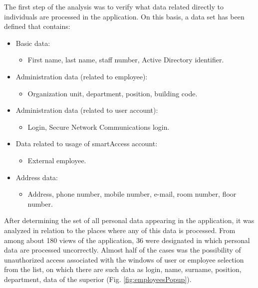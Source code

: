 \documentclass[en, noamssymb]{mgr}
\begin{document}
The first step of the analysis was to verify what data related directly to individuals are processed in the application. On this basis, a data set has been defined that contains:

\begin{itemize}

\item Basic data:

\begin{itemize}
\item First name, last name, staff number, Active Directory identifier.
\end{itemize}

\item Administration data (related to employee):

\begin{itemize}
\item Organization unit, department, position, building code.
\end{itemize}

\item Administration data (related to user account):

\begin{itemize}
\item Login, Secure Network Communications login.
\end{itemize}

\item Data related to usage of smartAccess account:

\begin{itemize}
\item External employee.
\end{itemize}

\item Address data:

\begin{itemize}
\item Address, phone number, mobile number, e-mail, room number, floor number.
\end{itemize}

\end{itemize}

After determining the set of all personal data appearing in the application, it was analyzed in relation to the places where any of this data is processed. From among about 180 views of the application, 36 were designated in which personal data are processed uncorrectly. Almost half of the cases was the possibility of unauthorized access associated with the windows of user or employee selection from the list, on which there are such data as login, name, surname, position, department, data of the superior (Fig. \ref{fig:employeesPopup}).
\end{document}
